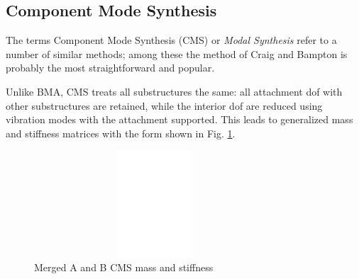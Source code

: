 \documentclass[11pt,openany,twoside]{book}
\numberwithin{equation}{section}		%
\newcommand{\Newterm}[1]{{\em #1}}	%
\newcommand{\Figref}[1]{Fig. \ref{#1}}  %
\newcommand{\Ss}{substructure}
\begin{document}
\subsection{Component Mode Synthesis}\label{sect:cms}
\par
The terms Component Mode Synthesis (CMS) or \Newterm{Modal Synthesis}
 
refer to a number of similar methods;
among these the method of Craig and Bampton \cite{craig1968coupling}
is probably the most straightforward and popular.
\par
Unlike BMA, CMS treats all substructures the same: all attachment dof
with other substructures are retained, while the interior dof are reduced using
vibration modes with the attachment supported. This leads to generalized mass
and stiffness matrices with the form shown in \Figref{fig:ss-cms}.
\begin{figure}
	\centering
	\includegraphics[height=4.0cm,width=9.0cm]{cms.eps}
	\caption{Merged A and B CMS mass and stiffness}\label{fig:ss-cms}
\end{figure}
\end{document}
